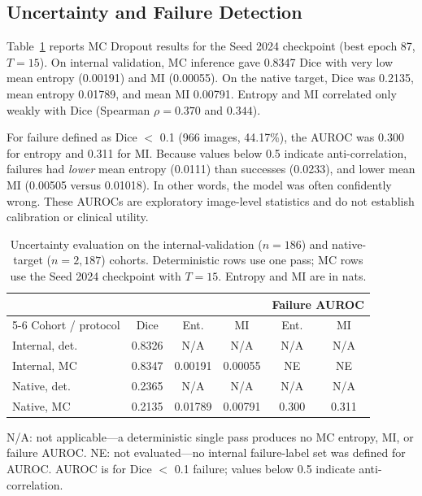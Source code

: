 \documentclass[conference]{IEEEtran}
\begin{document}
\subsection{Uncertainty and Failure Detection}

Table~\ref{tab:uncert} reports MC Dropout results for the Seed 2024 checkpoint (best epoch 87, $T=15$). On internal validation, MC inference gave 0.8347 Dice with very low mean entropy (0.00191) and MI (0.00055). On the native target, Dice was 0.2135, mean entropy 0.01789, and mean MI 0.00791. Entropy and MI correlated only weakly with Dice (Spearman $\rho=0.370$ and $0.344$).

For failure defined as Dice $<$ 0.1 (966 images, 44.17\%), the AUROC was 0.300 for entropy and 0.311 for MI. Because values below 0.5 indicate anti-correlation, failures had \emph{lower} mean entropy (0.0111) than successes (0.0233), and lower mean MI (0.00505 versus 0.01018). In other words, the model was often confidently wrong. These AUROCs are exploratory image-level statistics and do not establish calibration or clinical utility.

\begin{table}[!t]
\centering
\caption{Uncertainty evaluation on the internal-validation ($n=186$) and native-target ($n=2{,}187$) cohorts. Deterministic rows use one pass; MC rows use the Seed 2024 checkpoint with $T=15$. Entropy and MI are in nats.}
\label{tab:uncert}
\scriptsize
\setlength{\tabcolsep}{2.6pt}
\begin{tabular}{@{}lccccc@{}}
\toprule
& & & & \multicolumn{2}{c}{Failure AUROC} \\
\cmidrule(lr){5-6}
Cohort / protocol & Dice & Ent. & MI & Ent. & MI \\
\midrule
Internal, det. & 0.8326 & N/A & N/A & N/A & N/A \\
Internal, MC  & 0.8347 & 0.00191 & 0.00055 & NE & NE \\
Native, det. & 0.2365 & N/A & N/A & N/A & N/A \\
Native, MC  & 0.2135 & 0.01789 & 0.00791 & 0.300 & 0.311 \\
\bottomrule
\end{tabular}

\vspace{2pt}
{\scriptsize N/A: not applicable---a deterministic single pass produces no MC entropy, MI, or failure AUROC. NE: not evaluated---no internal failure-label set was defined for AUROC. AUROC is for Dice $<$ 0.1 failure; values below 0.5 indicate anti-correlation.}
\end{table}
\end{document}
